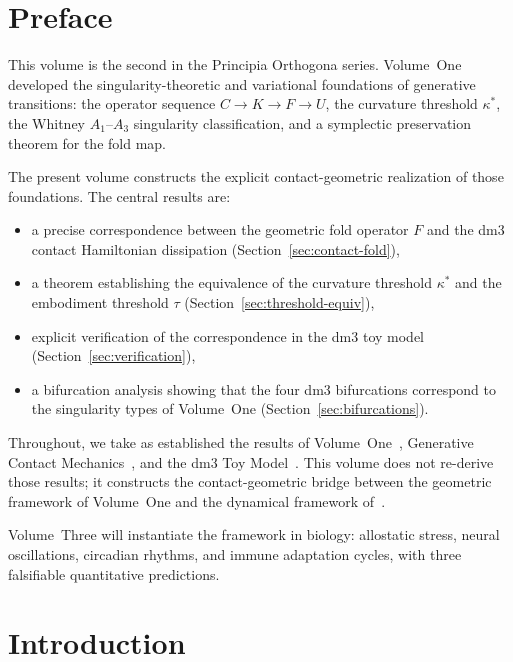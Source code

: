 \documentclass[12pt, oneside]{book}
\theoremstyle{plain}
\theoremstyle{definition}
\theoremstyle{remark}
\begin{document}
\section*{Preface}

This volume is the second in the Principia Orthogona series.
Volume~One~\cite{PO1} developed the singularity-theoretic and
variational foundations of generative transitions: the operator
sequence $C\to K\to F\to U$, the curvature threshold $\kappa^*$,
the Whitney $A_1$--$A_3$ singularity classification, and a
symplectic preservation theorem for the fold map.

The present volume constructs the explicit contact-geometric
realization of those foundations. The central results are:
\begin{itemize}[leftmargin=*]
  \item a precise correspondence between the geometric fold operator
        $F$ and the dm3 contact Hamiltonian dissipation
        (Section~\ref{sec:contact-fold}),
  \item a theorem establishing the equivalence of the curvature
        threshold $\kappa^*$ and the embodiment threshold $\tau$
        (Section~\ref{sec:threshold-equiv}),
  \item explicit verification of the correspondence in the dm3 toy
        model (Section~\ref{sec:verification}),
  \item a bifurcation analysis showing that the four dm3 bifurcations
        correspond to the singularity types of Volume~One
        (Section~\ref{sec:bifurcations}).
\end{itemize}

Throughout, we take as established the results of
Volume~One~\cite{PO1}, Generative Contact Mechanics~\cite{Paper1},
and the dm3 Toy Model~\cite{Paper2}. This volume does not re-derive
those results; it constructs the contact-geometric bridge between
the geometric framework of Volume~One and the dynamical framework
of~\cite{Paper1,Paper2}.

Volume~Three will instantiate the framework in biology:
allostatic stress, neural oscillations, circadian rhythms,
and immune adaptation cycles, with three falsifiable quantitative
predictions.

\section{Introduction}
\label{sec:intro}
\end{document}
